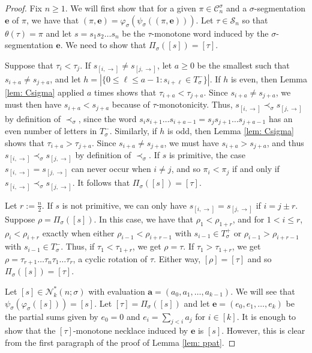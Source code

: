 \documentclass[12pt]{article}
\renewcommand{\S}{\mathcal{S}}
\newcommand{\C}{\mathcal{C}}
\newcommand{\N}{\mathcal{N}}
\newcommand{\e}{\mathbf{e}}
\theoremstyle{plain}
\newtheorem{lemma}[theorem]{Lemma}
\theoremstyle{definition}
\begin{document}
\begin{proof}
Fix $n\geq 1$. We will first show that for a given $\pi\in \C_n^\sigma$ and a $\sigma$-segmentation $\e$ of $\pi$, we have that $(\pi,\e) = \varphi_\sigma(\psi_\sigma((\pi,\e)))$. Let $\tau\in\S_n$ so that $\theta(\tau)=\pi$ and let $s=s_1s_2\ldots s_n$ be the $\tau$-monotone word induced by the $\sigma$-segmentation $\e$. 
We need to show that $\Pi_\sigma([s])=[\tau]$. 

Suppose that $\tau_i<\tau_j$. If $s_{[i,\rightarrow]}\neq s_{[j,\rightarrow]}$, let $a\ge0$ be the smallest such that $s_{i+a}\neq  s_{j+a}$,
and let $h=|\{0\le \ell \le a-1 : s_{i+\ell} \in T^-_\sigma\}|$.
 If $h$ is even, then Lemma \ref{lem: Csigma} applied $a$ times shows that $\tau_{i+a}<\tau_{j+a}$. Since $s_{i+a}\neq s_{j+a}$, we must then have $s_{i+a} < s_{j+a}$ because of $\tau$-monotonicity.
Thus, $s_{[i,\rightarrow]}\prec_\sigma s_{[j,\rightarrow]}$ by definition of $\prec_\sigma$, since the word $s_is_{i+1}\dots s_{i+a-1}= s_js_{j+1}\dots s_{j+a-1}$ has an even number of letters in $T^-_\sigma$.
 Similarly, if $h$ is odd, then Lemma \ref{lem: Csigma} shows that  $\tau_{i+a}>\tau_{j+a}$. Since $s_{i+a}\neq s_{j+a}$, we must have $s_{i+a} > s_{j+a}$, and thus $s_{[i,\rightarrow]}\prec_\sigma s_{[j,\rightarrow]}$
by definition of $\prec_\sigma$.
If $s$ is primitive, the case $s_{[i,\rightarrow]}=s_{[j,\rightarrow]}$ can never occur when $i\neq j$, and so $\pi_i<\pi_j$ if and only if $s_{[i,\rightarrow]} \prec_\sigma s_{[j,\rightarrow]}$. 
It follows that $\Pi_\sigma([s])=[\tau]$.

 Let $r:=\frac{n}{2}$.
 If $s$ is not primitive, we can only have $s_{[i,\rightarrow]}=s_{[j,\rightarrow]}$ if $i = j\pm r$. Suppose $\rho=\Pi_\sigma([s])$. In this case, we have that $\rho_1<\rho_{1+r}$, and for $1<i\leq r$, $\rho_i<\rho_{i+r}$ exactly when either $\rho_{i-1}<\rho_{i+r-1}$ with $s_{i-1}\in T^+_\sigma$ or  $\rho_{i-1}>\rho_{i+r-1}$ with $s_{i-1}\in T^-_\sigma$. Thus, if $\tau_1<\tau_{1+r}$, we get $\rho=\tau$. If $\tau_1>\tau_{1+r}$, we get $\rho=\tau_{r+1}\ldots \tau_n\tau_1\ldots\tau_r$, a cyclic rotation of $\tau$. Either way, $[\rho]=[\tau]$ and so $\Pi_\sigma([s])=[\tau]$.  

Let $[s]\in\N^*_k(n;\sigma)$ with evaluation $\mathbf{a}=(a_0, a_1, \ldots, a_{k-1})$. We will see that $\psi_\sigma(\varphi_\sigma([s]))=[s]$. Let $[\tau]=\Pi_\sigma([s])$ and let $\e=(e_0,e_1,\ldots,e_k)$ be the partial sums given by $e_0=0$ and $e_i=\sum_{j<i}a_j$ for $i\in[k]$. It is enough to show that the $[\tau]$-monotone necklace induced by $\e$ is $[s]$. However, this is clear from the first paragraph of the proof of Lemma \ref{lem: ppat}.
\end{proof}
\end{document}
